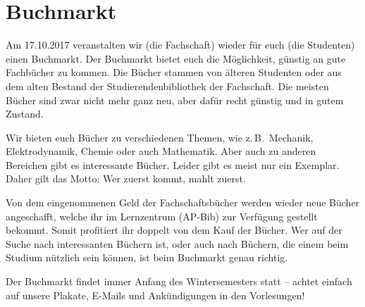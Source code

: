\vspace{-6ex}
\section{Buchmarkt}
\vspace{-3ex}
\begin{multicols*}{2}
\begin{figure}
\end{figure}
Am 17.10.2017 veranstalten wir (die Fachschaft) wieder für euch (die Studenten) einen Buchmarkt.
Der Buchmarkt bietet euch die Möglichkeit, günstig an gute Fachbücher zu kommen.
Die Bücher stammen von älteren Studenten oder aus dem alten Bestand der Studierendenbibliothek der Fachschaft.
Die meisten Bücher sind zwar nicht mehr ganz neu, aber dafür recht günstig und in gutem Zustand.

Wir bieten euch Bücher zu verschiedenen Themen, wie z.\,B.\ Mechanik, Elektrodynamik, Chemie oder auch Mathematik.
Aber auch zu anderen Bereichen gibt es interessante Bücher.
Leider gibt es meist nur ein Exemplar.
Daher gilt das Motto: Wer zuerst kommt, mahlt zuerst.

Von dem eingenommenen Geld der Fachschaftsbücher werden wieder neue Bücher angeschafft, welche ihr im Lernzentrum (AP-Bib) zur Verfügung gestellt bekommt.
Somit profitiert ihr doppelt von dem Kauf der Bücher.
Wer auf der Suche nach interessanten Büchern ist, oder auch nach Büchern, die einem beim Studium nützlich sein können, ist beim Buchmarkt genau richtig.

Der Buchmarkt findet immer Anfang des Wintersemesters statt -- achtet einfach auf unsere Plakate, E-Mails und Ankündigungen in den Vorlesungen!

\end{multicols*}

